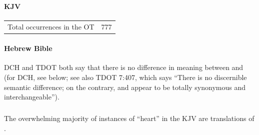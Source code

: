 		\paragraph{KJV}
			\label{HEART-OT-KJV}
	
			\begin{tabular}{ll}
				Total occurrences in the OT & 777
			\end{tabular}
			
			
		\paragraph{Hebrew Bible}
			\label{HEART-HEBREW}
			
			DCH and TDOT both say that there is no difference in meaning between  and  (for DCH, see below; see also TDOT 7:407, which says ``There is no discernible semantic difference; on the contrary,  and  appear to be totally synonymous and interchangeable'').
		
			\subparagraph{\texorpdfstring{}{}} %
				\label{LEB} %
				
				The overwhelming majority of instances of ``heart'' in the KJV are translations of .
			
